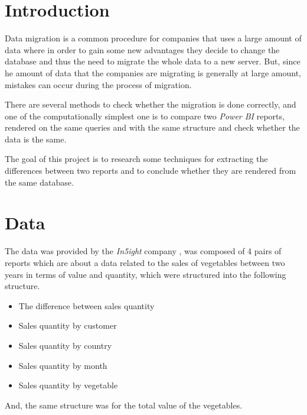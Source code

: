 \documentclass[fleqn,moreauthors,10pt]{ds_report}
\affiliation{\textit{Advisors: prof. dr. Erik \v{S}trumbelj}}
\begin{document}
\flushbottom 

\maketitle 

\thispagestyle{empty} 


\section*{Introduction}
	Data migration is a common procedure for companies that uses a large amount of data where in order to gain some new advantages they decide to change the database and thus the need to migrate the whole data to a new server. But, since he amount of data that the companies are migrating is generally at large amount, mistakes can occur during the process of migration. 
 \par
 There are several methods to check whether the migration is done correctly, and one of the computationally simplest one is to compare two \textit{Power BI} reports, rendered on the same queries and with the same structure and check whether the data is the same.
 \par
 The goal of this project is to research some techniques for extracting the differences between two reports and to conclude whether they are rendered from the same database.


\section*{Data}
The data was provided by the \textit{In5ight} company \cite{insight}, was composed of 4 pairs of reports which are about a data related to the sales of vegetables between two years in terms of value and quantity, which were structured into the following structure.
\begin{itemize}
    \item The difference between sales quantity
    \item Sales quantity by customer
    \item Sales quantity by country
    \item Sales quantity by month
    \item Sales quantity by vegetable
\end{itemize}
And, the same structure was for the total value of the vegetables.
\end{document}
